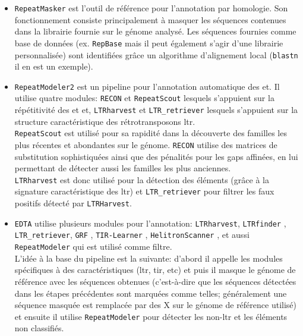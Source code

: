 \documentclass[10pt]{article}
\begin{document}
\begin{itemize}
    \item[\ding{42}] \texttt{RepeatMasker} est l'outil de référence pour l'annotation par homologie. Son fonctionnement consiste principalement à \og masquer \fg{} les séquences contenues dans la librairie fournie sur le génome analysé. Les séquences fournies comme base de données (ex. \texttt{RepBase} mais il peut également s'agir d'une librairie personnalisée) sont identifiées grâce un algorithme d'alignement local (\texttt{blastn} il en est un exemple).
    \item[\ding{42}] \texttt{RepeatModeler2} est un pipeline pour l'annotation automatique des \acrshort{et}. Il utilise quatre modules: \texttt{RECON} \cite{bao_automated_2002} et \texttt{RepeatScout} \cite{repeatscout} lesquels s'appuient sur la répétitivité des \acrshort{et} et, \texttt{LTRharvest} \cite{ellinghaus_ltrharvest_2008} et \texttt{LTR\_retriever} \cite{ou_ltr_retriever_2018} lesquels s'appuient sur la structure caractéristique des rétrotransposons \acrshort{ltr}. \\
    \texttt{RepeatScout} est utilisé pour sa rapidité dans la découverte des familles les plus récentes et abondantes sur le génome. \texttt{RECON} utilise des matrices de substitution sophistiquées ainsi que des pénalités pour les gaps affinées, en lui permettant de détecter aussi les familles les plus anciennes. \\
    \texttt{LTRharvest} est donc utilisé pour la détection des éléments (grâce à la signature caractéristique des \acrshort{ltr}) et \texttt{LTR\_retriever} pour filtrer les faux positifs détecté par \texttt{LTRHarvest}.

    \item[\ding{42}] \texttt{EDTA} utilise plusieurs modules pour l'annotation: \texttt{LTRharvest}, \texttt{LTRfinder} \cite{xu_ltr_finder_2007},  \texttt{LTR\_retriever}, \texttt{GRF} \cite{shi_generic_2019}, \texttt{TIR-Learner} \cite{su_tir-learner_2019}, \texttt{HelitronScanner} \cite{xiong_helitronscanner_2014}, et aussi \texttt{RepeatModeler} qui est utilisé comme filtre. \\
L'idée à la base du pipeline est la suivante: d'abord il appelle les modules spécifiques à des caractéristiques (\acrshort{ltr}, \acrshort{tir}, etc) et puis il masque le génome de référence avec les séquences obtenues (c'est-à-dire que les séquences détectées dans les étapes précédentes sont marquées comme telles; généralement une séquence masquée est remplacée par des \og X \fg{} sur le génome de référence utilisé) et ensuite il utilise \texttt{RepeatModeler} pour détecter les non-\acrshort{ltr} et les éléments non classifiés.
\end{itemize}
\end{document}
